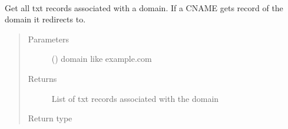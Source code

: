 \documentclass[a4paper,10pt,english,openany,oneside]{sphinxmanual}
\begin{document}
\begin{fulllineitems}
\label{\detokenize{functions:sdvalidator.resolve_record}}~
\begin{sphinxVerbatim}[commandchars=\\\{\}]
\end{sphinxVerbatim}

Get all txt records associated with a domain.
If a CNAME gets record of the domain it redirects to.
\begin{quote}\begin{description}
\item[{Parameters}] \leavevmode
{} () \textendash{} domain like example.com

\item[{Returns}] \leavevmode
List of txt records associated with the domain

\item[{Return type}] \leavevmode
{}

\end{description}\end{quote}

\end{fulllineitems}

\end{document}

